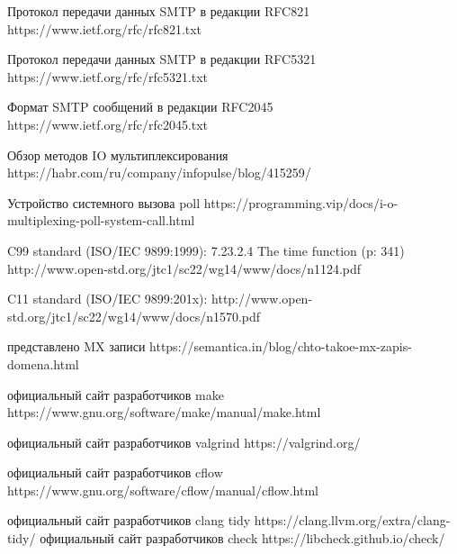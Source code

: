 \documentclass[a4paper,12pt]{report}
\begin{document}
  \newpage
    \begin{thebibliography}{11} 
    
     Протокол передачи данных SMTP в редакции RFC821 https://www.ietf.org/rfc/rfc821.txt
    
     Протокол передачи данных SMTP в редакции RFC5321 https://www.ietf.org/rfc/rfc5321.txt
    
       Формат SMTP сообщений в редакции RFC2045 https://www.ietf.org/rfc/rfc2045.txt
    
     Обзор методов IO мультиплексирования https://habr.com/ru/company/infopulse/blog/415259/
    
     Устройство системного вызова poll https://programming.vip/docs/i-o-multiplexing-poll-system-call.html
    
      C99 standard (ISO/IEC 9899:1999): 7.23.2.4 The time function (p: 341) 
     \\http://www.open-std.org/jtc1/sc22/wg14/www/docs/n1124.pdf
     
      C11 standard (ISO/IEC 9899:201x): http://www.open-std.org/jtc1/sc22/wg14/www/docs/n1570.pdf
     
       представлено MX записи https://semantica.in/blog/chto-takoe-mx-zapis-domena.html
      
      официальный сайт разработчиков make   https://www.gnu.org/software/make/manual/make.html
    
      официальный сайт разработчиков valgrind https://valgrind.org/
    
      официальный сайт разработчиков cflow  https://www.gnu.org/software/cflow/manual/cflow.html
     
       официальный сайт разработчиков clang tidy   https://clang.llvm.org/extra/clang-tidy/
     официальный сайт разработчиков check  https://libcheck.github.io/check/
    \end{thebibliography}
\end{document}
